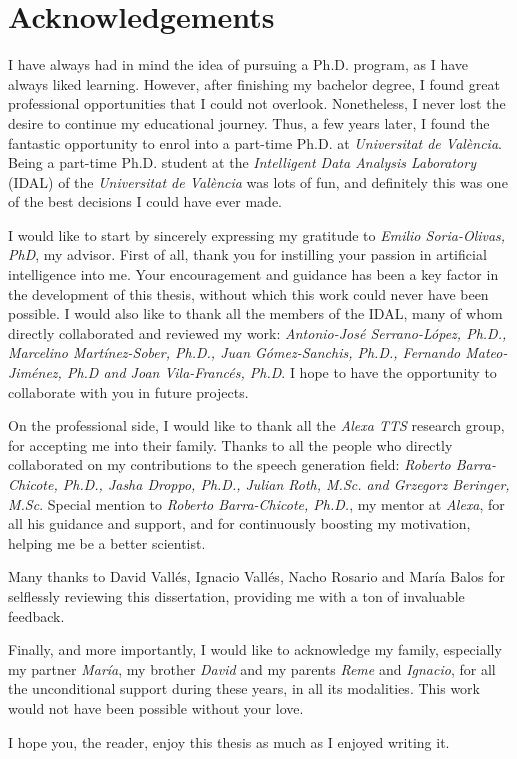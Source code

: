 \chapter*{Acknowledgements}

I have always had in mind the idea of pursuing a Ph.D. program, as I have always liked learning. However, after finishing my bachelor degree, I found great professional opportunities that I could not overlook. Nonetheless, I never lost the desire to continue my educational journey.  Thus, a  few years later, I found the fantastic opportunity to enrol into a part-time Ph.D. at \textit{Universitat de València}. Being a part-time Ph.D. student at the \textit{Intelligent Data Analysis Laboratory} (IDAL) of the \textit{Universitat de València} was lots of fun, and definitely this was one of the best decisions I could have ever made.  

I would like to start by sincerely expressing my gratitude to \textit{Emilio Soria-Olivas, PhD}, my advisor. First of all, thank you for instilling your passion in artificial intelligence into me. Your encouragement and guidance has been a key factor in the development of this thesis, without which this work could never have been possible. I would also like to thank all the members of the IDAL, many of whom directly collaborated and reviewed my work: \textit{Antonio-José Serrano-López, Ph.D., Marcelino  Martínez-Sober, Ph.D., Juan Gómez-Sanchis, Ph.D., Fernando Mateo-Jiménez, Ph.D and Joan Vila-Francés, Ph.D}. I hope to have the opportunity to collaborate with you in future projects.

On the professional side, I would like to thank all the \textit{Alexa TTS} research group, for accepting me into their family. Thanks to all the people who directly collaborated on my contributions to the speech generation field: \textit{Roberto Barra-Chicote, Ph.D., Jasha Droppo, Ph.D., Julian Roth, M.Sc. and Grzegorz Beringer, M.Sc}. Special mention to \textit{Roberto Barra-Chicote, Ph.D.}, my mentor at \textit{Alexa}, for all his guidance and support, and for continuously boosting my motivation, helping me be a better scientist.

Many thanks to David Vallés, Ignacio Vallés, Nacho Rosario and María Balos for selflessly reviewing this dissertation, providing me with a ton of invaluable feedback.

Finally, and more importantly, I would like to acknowledge my family, especially my partner \textit{María}, my brother \textit{David} and my parents \textit{Reme} and \textit{Ignacio}, for all the unconditional support during these years, in all its modalities. This work would not have been possible without your love.

I hope you, the reader, enjoy this thesis as much as I enjoyed writing it. 
\clearpage
